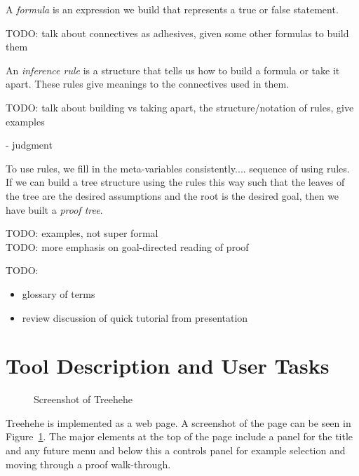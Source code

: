 \documentclass[conference]{IEEEtran}
\newcommand{\projectname}{Treehehe}
\begin{document}
A \textit{formula} is an expression we build that represents a true or false statement.

TODO: talk about connectives as adhesives, given some other formulas to build them

An \textit{inference rule} is a structure that tells us how to build a formula or take it apart. These rules give meanings to the connectives used in them.

TODO: talk about building vs taking apart, the structure/notation of rules, give examples

- judgment

To use rules, we fill in the meta-variables consistently.... sequence of using rules. If we can build a tree structure using the rules this way such that the leaves of the tree are the desired assumptions and the root is the desired goal, then we have built a \textit{proof tree}.

TODO: examples, not super formal \\

TODO: more emphasis on goal-directed reading of proof

TODO:
\begin{itemize}
\item glossary of terms
\item review discussion of quick tutorial from presentation
\end{itemize}



\section{Tool Description and User Tasks}

\begin{figure}

\begin{center}
\end{center}

\caption{Screenshot of \projectname{}}
\label{fig:screenshot}

\end{figure}

\projectname{} is implemented as a web page. A screenshot of the page can be seen in Figure~\ref{fig:screenshot}. The major elements at the top of the page include a panel for the title and any future menu and below this a controls panel for example selection and moving through a proof walk-through.
\end{document}
